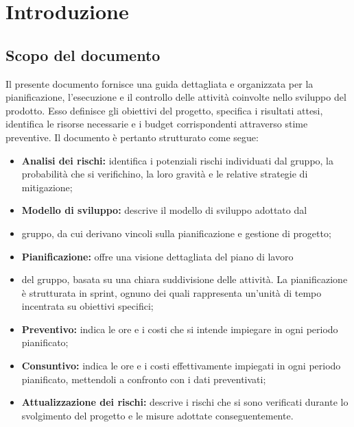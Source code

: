 \section{Introduzione}
    \subsection{Scopo del documento} 
    Il presente documento fornisce una guida dettagliata e organizzata per la pianificazione, 
    l'esecuzione e il controllo delle attività coinvolte nello sviluppo del prodotto. Esso
    definisce gli obiettivi del progetto, specifica i risultati attesi, identifica le risorse necessarie e
    i budget corrispondenti attraverso stime preventive. 
    Il documento è pertanto strutturato come segue:
    \begin{itemize}
        \item \textbf{Analisi dei rischi:} identifica i potenziali rischi individuati 
        dal gruppo, la probabilità che si verifichino, la loro gravità e le relative
        strategie di mitigazione;
        \item \textbf{Modello di sviluppo:} descrive il modello di sviluppo adottato dal
        \item gruppo, da cui derivano vincoli sulla pianificazione e gestione di progetto;
        \item \textbf{Pianificazione:} offre una visione dettagliata del piano di lavoro
        \item del gruppo, basata su una chiara suddivisione delle attività. 
        La pianificazione è strutturata in sprint, ognuno dei quali 
        rappresenta un'unità di tempo incentrata su obiettivi specifici;
        \item \textbf{Preventivo:} indica le ore e i costi che si intende impiegare
        in ogni periodo pianificato;
        \item \textbf{Consuntivo:} indica le ore e i costi effettivamente impiegati
        in ogni periodo pianificato, mettendoli a confronto con i dati preventivati;
        \item \textbf{Attualizzazione dei rischi:} descrive i rischi che si sono verificati
        durante lo svolgimento del progetto e le misure adottate conseguentemente.
    \end{itemize}


